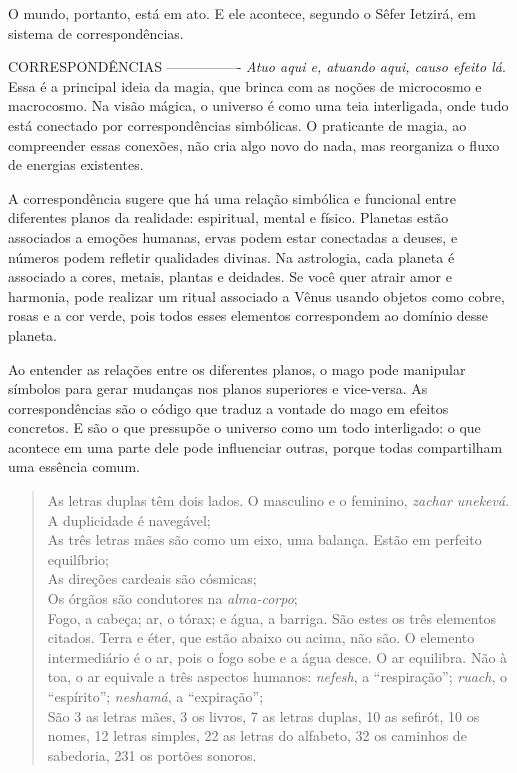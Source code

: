 O mundo, portanto, está em ato. E ele acontece, segundo o Sêfer Ietzirá, em sistema de correspondências.

CORRESPONDÊNCIAS
----------------
\textit{Atuo aqui e, atuando aqui, causo efeito lá}. Essa é a principal ideia da magia, que brinca com as noções de microcosmo e macrocosmo. Na visão mágica, o universo é como uma teia interligada, onde tudo está conectado por correspondências simbólicas. O praticante de magia, ao compreender essas conexões, não cria algo novo do nada, mas reorganiza o fluxo de energias existentes.

A correspondência sugere que há uma relação simbólica e funcional entre diferentes planos da realidade: espiritual, mental e físico. Planetas estão associados a emoções humanas, ervas podem estar conectadas a deuses, e números podem refletir qualidades divinas. Na astrologia, cada planeta é associado a cores, metais, plantas e deidades. Se você quer atrair amor e harmonia, pode realizar um ritual associado a Vênus usando objetos como cobre, rosas e a cor verde, pois todos esses elementos correspondem ao domínio desse planeta.

Ao entender as relações entre os diferentes planos, o mago pode manipular símbolos para gerar mudanças nos planos superiores e vice-versa. As correspondências são o código que traduz a vontade do mago em efeitos concretos. E são o que pressupõe o universo como um todo interligado: o que acontece em uma parte dele pode influenciar outras, porque todas compartilham uma essência comum.

\begin{verse}
As letras duplas têm dois lados. O masculino e o feminino, \textit{zachar unekevá}. A duplicidade é navegável;\\
As três letras mães são como um eixo, uma balança. Estão em perfeito equilíbrio;\\
As direções cardeais são cósmicas;\\
Os órgãos são condutores na \textit{alma-corpo};\\
Fogo, a cabeça; ar, o tórax; e água, a barriga. São estes os três elementos citados. Terra e éter, que estão abaixo ou acima, não são. O elemento intermediário é o ar, pois o fogo sobe e a água desce. O ar equilibra. Não à toa, o ar equivale a três aspectos humanos: \textit{nefesh}, a ``respiração''; \textit{ruach}, o ``espírito''; \textit{neshamá}, a ``expiração'';\\
São 3 as letras mães, 3 os livros, 7 as letras duplas, 10 as sefirót, 10 os nomes, 12 letras simples, 22 as letras do alfabeto, 32 os caminhos de sabedoria, 231 os portões sonoros. 
\end{verse}

